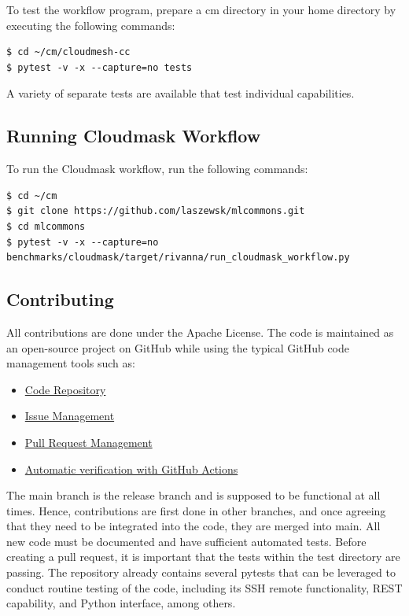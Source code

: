 To test the workflow program, prepare a cm directory in your home
directory by executing the following commands:

\begin{verbatim}
$ cd ~/cm/cloudmesh-cc
$ pytest -v -x --capture=no tests
\end{verbatim}

A variety of separate tests are available that test individual
capabilities.


% 


\subsection{Running Cloudmask Workflow}\label{sec:running-cloudmask}

To run the Cloudmask workflow, run the following commands:

\begin{verbatim}
$ cd ~/cm
$ git clone https://github.com/laszewsk/mlcommons.git
$ cd mlcommons
$ pytest -v -x --capture=no benchmarks/cloudmask/target/rivanna/run_cloudmask_workflow.py
\end{verbatim}


% 


\subsection{Contributing}\label{contributing}

All contributions are done under the Apache License. The code is
maintained as an open-source project on GitHub while using the typical
GitHub code management tools such as:

\begin{itemize}
\item
  \href{https://github.com/cloudmesh/cloudmesh-cc}{Code Repository}
\item
  \href{https://github.com/cloudmesh/cloudmesh-cc/issues}{Issue Management}
\item
  \href{https://github.com/cloudmesh/cloudmesh-cc/pulls}{Pull Request Management}
\item
  \href{https://github.com/cloudmesh/cloudmesh-cc/actions}{Automatic verification with GitHub Actions}
\end{itemize}

The main branch is the release branch and is supposed to be functional
at all times. Hence, contributions are first done in other branches,
and once agreeing that they need to be integrated into the code, they
are merged into main. All new code must be documented and have
sufficient automated tests. Before creating a pull request, it is
important that the tests within the test directory are passing. The
repository already contains several pytests that can be leveraged to
conduct routine testing of the code, including its SSH remote
functionality, REST capability, and Python interface, among others.
